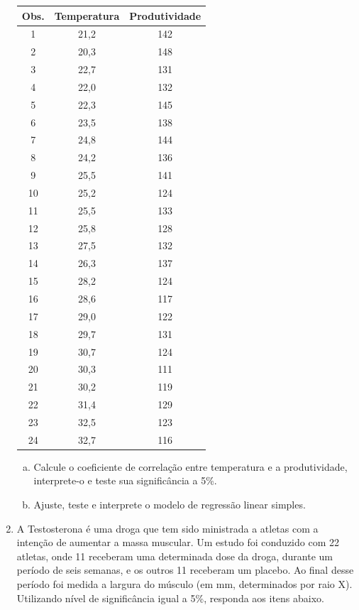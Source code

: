 \documentclass[12pt, a4paper]{article}
\begin{document}
\begin{enumerate}
\begin{center}
\begin{tabular}{|c|c|c|}
\hline
\textbf{Obs.} & \textbf{Temperatura} & \textbf{Produtividade} \\
\hline
1 & 21,2 & 142 \\
2 & 20,3 & 148 \\
3 & 22,7 & 131 \\
4 & 22,0 & 132 \\
5 & 22,3 & 145 \\
6 & 23,5 & 138 \\
7 & 24,8 & 144 \\
8 & 24,2 & 136 \\
9 & 25,5 & 141 \\
10 & 25,2 & 124 \\
11 & 25,5 & 133 \\
12 & 25,8 & 128 \\
13 & 27,5 & 132 \\
14 & 26,3 & 137 \\
15 & 28,2 & 124 \\
16 & 28,6 & 117 \\
17 & 29,0 & 122 \\
18 & 29,7 & 131 \\
19 & 30,7 & 124 \\
20 & 30,3 & 111 \\
21 & 30,2 & 119 \\
22 & 31,4 & 129 \\
23 & 32,5 & 123 \\
24 & 32,7 & 116 \\
\hline
\end{tabular}
\end{center}

\begin{enumerate}[a)]
    \item Calcule o coeficiente de correlação entre temperatura e a produtividade, interprete-o e teste sua significância a 5\%.
    \item Ajuste, teste e interprete o modelo de regressão linear simples.
\end{enumerate}


\item A Testosterona é uma droga que tem sido ministrada a atletas com a intenção de aumentar a massa muscular. Um estudo foi conduzido com 22 atletas, onde 11 receberam uma determinada dose da droga, durante um período de seis semanas, e os outros 11 receberam um placebo. Ao final desse período foi medida a largura do músculo (em mm, determinados por raio X). Utilizando nível de significância igual a 5\%, responda aos itens abaixo.


\end{enumerate}
\end{document}
